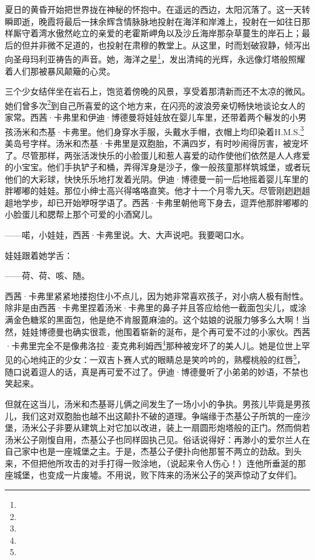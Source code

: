 \par 夏日的黄昏开始把世界拢在神秘的怀抱中。在遥远的西边，太阳沉落了。这一天转瞬即逝，晚霞将最后一抹余辉含情脉脉地投射在海洋和岸滩上，投射在一如往日那样厮守着湾水傲然屹立的亲爱的老霍斯岬角以及沙丘海岸那杂草蔓生的岸石上；最后的但并非微不足道的，也投射在肃穆的教堂上。从这里，时而划破寂静，倾泻出向圣母玛利亚祷告的声音。她，海洋之星\footnote{}，发出清纯的光辉，永远像灯塔般照耀着人们那被暴风颠簸的心灵。
\par 三个少女结伴坐在岩石上，饱览着傍晚的风景，享受着那清新而还不太凉的微风。她们曾多次\footnote{}到自己所喜爱的这个地方来，在闪亮的波浪旁亲切畅快地谈论女人的家常。西茜·卡弗里和伊迪·博德曼将娃娃放在婴儿车里，还带着两个鬈发的小男孩汤米和杰基·卡弗里。他们身穿水手服，头戴水手帽，衣帽上均印染着H.M.S.\footnote{}美岛号字样。汤米和杰基·卡弗里是双胞胎，不满四岁，有时吵闹得厉害，被宠坏了。尽管那样，两张活泼快乐的小脸蛋儿和惹人喜爱的动作使他们依然是人人疼爱的小宝宝。他们手执铲子和桶，弄得浑身是沙子，像一般孩童那样筑城堡，或者玩他们的大彩球，快快乐乐地打发着光阴。伊迪·博德曼一前一后地摇着婴儿车里的胖嘟嘟的娃娃。那位小绅士高兴得咯咯直笑。他才十一个月零九天。尽管刚趔趔趄趄地学步，却已开始咿呀学语了。西茜·卡弗里朝他弯下身去，逗弄他那胖嘟嘟的小脸蛋儿和腮帮上那个可爱的小酒窝儿。
\par ——喏，小娃娃，西茜·卡弗里说。大、大声说吧。我要喝口水。
\par 娃娃跟着她学舌：
\par ——荷、荷、咳、随。
\par 西茜·卡弗里紧紧地搂抱住小不点儿，因为她非常喜欢孩子，对小病人极有耐性。除非是由西茜·卡弗里捏着汤米·卡弗里的鼻子并且答应给他一截面包尖儿，或涂满金色糖浆的黑面包，他是绝不肯服蓖麻油的。这个姑娘的说服力够多么大啊！当然，娃娃博德曼也确实很乖，他围着崭新的涎布，是个再可爱不过的小家伙。西茜·卡弗里完全不是像弗洛拉·麦克弗利姆西\footnote{}那种被宠坏了的美人儿。她是位世上罕见的心地纯正的少女：一双吉卜赛人式的眼睛总是笑吟吟的，熟樱桃般的红唇\footnote{}，随口说着逗人的话，真是再可爱不过了。伊迪·博德曼听了小弟弟的妙语，不禁也笑起来。
\par 但就在这当儿，汤米和杰基哥儿俩之间发生了一场小小的争执。男孩儿毕竟是男孩儿，我们这对双胞胎也越不出这颠扑不破的道理。争端缘于杰基公子所筑的一座沙堡，汤米公子非要从建筑上对它加以改进，装上一扇圆形炮塔般的正门。然而倘若汤米公子刚愎自用，杰基公子也同样固执己见。俗话说得好：再渺小的爱尔兰人在自己家中也是一座城堡之主。于是，杰基公子便扑向他那誓不两立的劲敌。到头来，不但把他所攻击的对手打得一败涂地，（说起来令人伤心！）连他所垂涎的那座城堡，也变成一片废墟。不用说，败下阵来的汤米公子的哭声惊动了女伴们。
